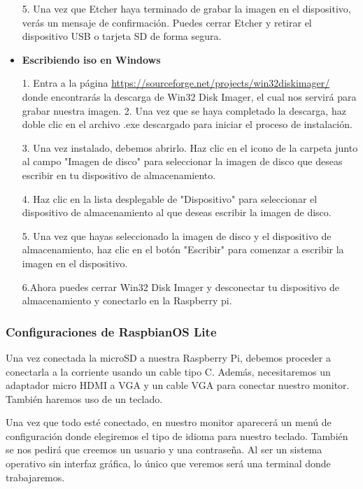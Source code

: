 \documentclass[report,12pt]{article}
\begin{document}
\begin{itemize}[label=$\bullet$, itemsep=0pt]
	5. Una vez que Etcher haya terminado de grabar la imagen en el dispositivo, verás un mensaje de confirmación. Puedes cerrar Etcher y retirar el dispositivo USB o tarjeta SD de forma segura.
	
	\item \textbf{Escribiendo iso en Windows} \par
	
	1. Entra a la página \url{https://sourceforge.net/projects/win32diskimager/} donde encontrarás la descarga de Win32 Disk Imager, el cual nos servirá para grabar nuestra imagen.
	2. Una vez que se haya completado la descarga, haz doble clic en el archivo .exe descargado para iniciar el proceso de instalación.
	
	3. Una vez instalado, debemos abrirlo. Haz clic en el icono de la carpeta junto al campo "Imagen de disco" para seleccionar la imagen de disco que deseas escribir en tu dispositivo de almacenamiento.
	
	4. Haz clic en la lista desplegable de "Dispositivo" para seleccionar el dispositivo de almacenamiento al que deseas escribir la imagen de disco.
	
	5. Una vez que hayas seleccionado la imagen de disco y el dispositivo de almacenamiento, haz clic en el botón "Escribir" para comenzar a escribir la imagen en el dispositivo.
	
	6.Ahora puedes cerrar Win32 Disk Imager y desconectar tu dispositivo de almacenamiento y conectarlo en la Raspberry pi.
	\end{itemize}
	\subsubsection{Configuraciones de RaspbianOS Lite}
	
	Una vez conectada la microSD a nuestra Raspberry Pi, debemos proceder a conectarla a la corriente usando un cable tipo C. Además, necesitaremos un adaptador micro HDMI a VGA y un cable VGA para conectar nuestro monitor. También haremos uso de un teclado.
	
	Una vez que todo esté conectado, en nuestro monitor aparecerá un menú de configuración donde elegiremos el tipo de idioma para nuestro teclado. También se nos pedirá que creemos un usuario y una contraseña. Al ser un sistema operativo sin interfaz gráfica, lo único que veremos será una terminal donde trabajaremos.
	
\end{document}
